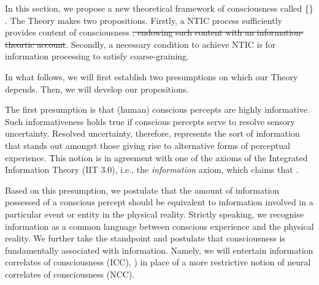 		In this section, we propose a new theoretical framework of consciousness called \{\tnamefull\}  %
			. 
		The Theory makes two propositions. Firstly, a NTIC process sufficiently provides content of consciousness \sout{, endowing such content with an information-theortic account}. Secondly, a necessary condition to achieve NTIC is for information processing to satisfy coarse-graining.

		In what follows, we will first establish two presumptions on which our Theory depends. Then, we will develop our propositions.

		The first presumption is that (human) conscious percepts are highly informative. Such informativeness holds true if conscious percepts serve to resolve sensory uncertainty. Resolved uncertainty, therefore, represents the sort of information that stands out amongst those giving rise to alternative forms of perceptual experience. This notion is in agreement with one of the axioms of the Integrated Information Theory (IIT 3.0), i.e., the \textit{information} axiom, which claims that  \citep[p. 2]{oizumi2014phenomenology}. 

		Based on this presumption, we postulate that the amount of information possessed of a conscious percept should be equivalent to information involved in a particular event or entity in the physical reality.
			\noindent
		Strictly speaking, we recognise information as a common language between conscious experience and the physical reality. We further take the standpoint and postulate that consciousness is fundamentally associated with information. Namely, we will entertain information correlates of consciousness (ICC), \cite{chalmers1996conscious, tononi2004information, gamez2011information, Gamez2016}) in place of a more restrictive notion of neural correlates of consciousness (NCC). 

